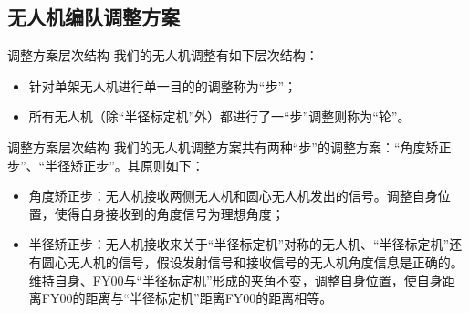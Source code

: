 \documentclass[aspectratio=169]{beamer}
\begin{document}
\subsection{无人机编队调整方案}

\begin{frame}{调整方案层次结构}
    我们的无人机调整有如下层次结构：
    \begin{itemize}
        \item 针对单架无人机进行单一目的的调整称为“步”；
        \item 所有无人机（除“半径标定机”外）都进行了一“步”调整则称为“轮”。
    \end{itemize}
\end{frame}

\begin{frame}{调整方案层次结构}
    我们的无人机调整方案共有两种“步”的调整方案：“角度矫正步”、“半径矫正步”。其原则如下：
    \begin{itemize}
        \item 角度矫正步：无人机接收两侧无人机和圆心无人机发出的信号。调整自身位置，使得自身接收到的角度信号为理想角度；
        \item 半径矫正步：无人机接收来关于“半径标定机”对称的无人机、“半径标定机”还有圆心无人机的信号，假设发射信号和接收信号的无人机角度信息是正确的。维持自身、FY00与“半径标定机”形成的夹角不变，调整自身位置，使自身距离FY00的距离与“半径标定机”距离FY00的距离相等。
    \end{itemize}
\end{frame}
\end{document}
